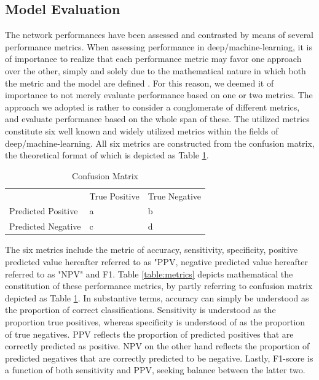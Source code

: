 \documentclass[12pt]{article}
\begin{document}
\clearpage
\subsection{Model Evaluation}
The network performances have been assessed and contrasted by means of several performance metrics. When assessing performance in deep/machine-learning, it is of importance to realize that each performance metric may favor one approach over the other, simply and solely due to the mathematical nature in which both the metric and the model are defined \cite{gunawardana2009survey}. For this reason, we deemed it of importance to not merely evaluate performance based on one or two metrics. The approach we adopted is rather to consider a conglomerate of different metrics, and evaluate performance based on the whole span of these. The utilized metrics constitute six well known and widely utilized metrics within the fields of deep/machine-learning. All six metrics are constructed from the confusion matrix, the theoretical format of which is depicted as Table \ref{table:confusion}.

\bigskip
\bgroup
\def\arraystretch{1.6}%
\begin{table}[h]
\caption{Confusion Matrix}
\label{table:confusion}
\begin{tabular}{lll}
                                        & True Positive          & True Negative          \\ \cline{2-3} 
\multicolumn{1}{l|}{Predicted Positive} & \multicolumn{1}{l|}{a} & \multicolumn{1}{l|}{b} \\ \cline{2-3} 
\multicolumn{1}{l|}{Predicted Negative} & \multicolumn{1}{l|}{c} & \multicolumn{1}{l|}{d} \\ \cline{2-3} 
\end{tabular}
\end{table}
\egroup
\bigskip

The six metrics include the metric of accuracy, sensitivity, specificity, positive predicted value hereafter referred to as "PPV, negative predicted value hereafter referred to as "NPV" and F1. Table \ref{table:metrics} depicts mathematical the constitution of these performance metrics, by partly referring to confusion matrix depicted as Table \ref{table:confusion}. In substantive terms, accuracy can simply be understood as the proportion of correct classifications. Sensitivity is understood as the proportion true positives, whereas specificity is understood of as the proportion of true negatives. PPV reflects the proportion of predicted positives that are correctly predicted as positive. NPV on the other hand reflects the proportion of predicted negatives that are correctly predicted to be negative. Lastly, F1-score is a function of both sensitivity and PPV, seeking balance between the latter two. 
\end{document}
